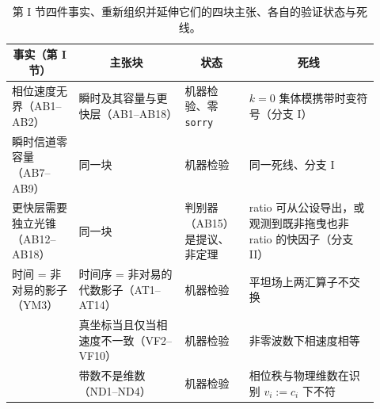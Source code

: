 \documentclass[aps,prd,preprint,superscriptaddress,amsmath,amssymb]{revtex4-2}
\begin{document}
\begin{table}[h]
\centering
\caption{第 I 节四件事实、重新组织并延伸它们的四块主张、各自的验证状态与死线。}
\begin{ruledtabular}
\begin{tabular}{@{}p{0.17\linewidth}p{0.27\linewidth}p{0.15\linewidth}p{0.33\linewidth}@{}}
\multicolumn{1}{c}{事实（第 I 节）} & \multicolumn{1}{c}{主张块} &
\multicolumn{1}{c}{状态} & \multicolumn{1}{c}{死线}\\
\hline
相位速度无界（AB1--AB2） & 瞬时及其容量与更快层（AB1--AB18） & 机器检验、零 \texttt{sorry} &
$k=0$ 集体模携带时变符号（分支 I）\\
瞬时信道零容量（AB7--AB9） & 同一块 & 机器检验 & 同一死线、分支 I\\
更快层需要独立光锥（AB12--AB18） & 同一块 & 判别器（AB15）是提议、非定理 &
ratio 可从公设导出，或观测到既非拖曳也非 ratio 的快因子（分支 II）\\
时间 = 非对易的影子（YM3） & 时间序 = 非对易的代数影子（AT1--AT14） & 机器检验 &
平坦场上两汇算子不交换\\
& 真坐标当且仅当相速度不一致（VF2--VF10） & 机器检验 & 非零波数下相速度相等\\
& 带数不是维数（ND1--ND4） & 机器检验 &
相位秩与物理维数在识别 $v_i:=c_i$ 下不符\\
\end{tabular}
\end{ruledtabular}
\end{table}
\end{document}
